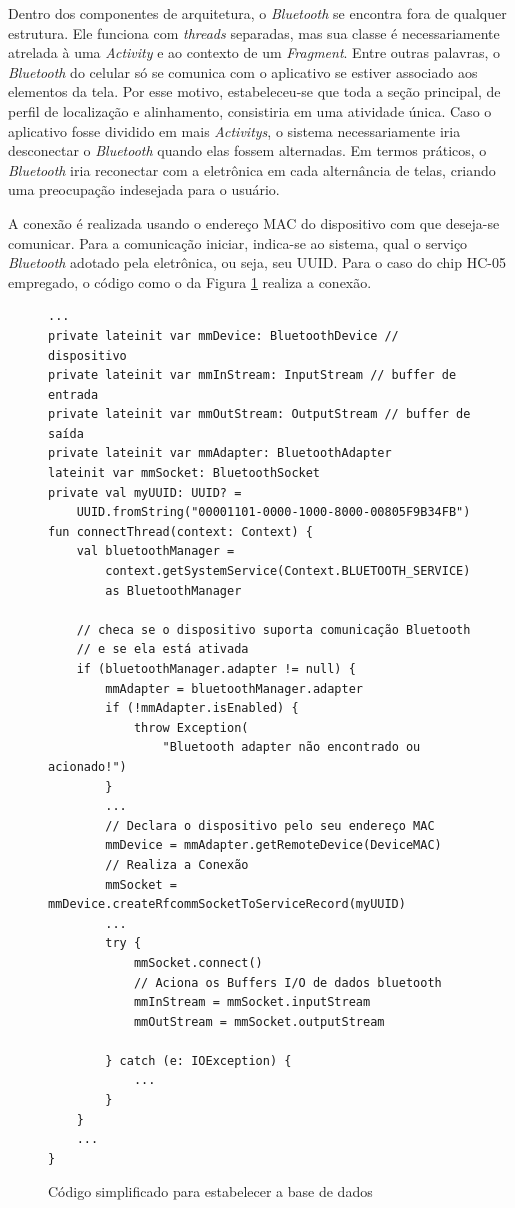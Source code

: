 Dentro dos componentes de arquitetura, o \textit{Bluetooth} se encontra fora de qualquer estrutura. Ele funciona com \textit{threads} separadas, mas sua classe é necessariamente atrelada à uma \textit{Activity} e ao contexto de um \textit{Fragment}. Entre outras palavras, o \textit{Bluetooth} do celular só se comunica com o aplicativo se estiver associado aos elementos da tela. Por esse motivo, estabeleceu-se que toda a seção principal, de perfil de localização e alinhamento, consistiria em uma atividade única. Caso o aplicativo fosse dividido em mais \textit{Activitys}, o sistema necessariamente iria desconectar o \textit{Bluetooth} quando elas fossem alternadas. Em termos práticos, o \textit{Bluetooth} iria reconectar com a eletrônica em cada alternância de telas, criando uma preocupação indesejada para o usuário. 

A conexão é realizada usando o endereço MAC do dispositivo com que deseja-se comunicar. Para a comunicação iniciar, indica-se ao sistema, qual o serviço \textit{Bluetooth} adotado pela eletrônica, ou seja, seu UUID. Para o caso do chip HC-05 empregado, o código como o da Figura \ref{code:bluetoothconnection} realiza a conexão.

\begin{figure}[!htb]
	\centering
	\caption{Código simplificado para estabelecer a base de dados}
	\vspace{-15pt}
	\begin{verbatim}
...
private lateinit var mmDevice: BluetoothDevice // dispositivo
private lateinit var mmInStream: InputStream // buffer de entrada
private lateinit var mmOutStream: OutputStream // buffer de saída
private lateinit var mmAdapter: BluetoothAdapter 
lateinit var mmSocket: BluetoothSocket
private val myUUID: UUID? =
	UUID.fromString("00001101-0000-1000-8000-00805F9B34FB")
fun connectThread(context: Context) {
	val bluetoothManager =
		context.getSystemService(Context.BLUETOOTH_SERVICE)
		as BluetoothManager
	
	// checa se o dispositivo suporta comunicação Bluetooth
	// e se ela está ativada
	if (bluetoothManager.adapter != null) {
		mmAdapter = bluetoothManager.adapter
		if (!mmAdapter.isEnabled) {
			throw Exception(
				"Bluetooth adapter não encontrado ou acionado!")
		}
		...
		// Declara o dispositivo pelo seu endereço MAC
		mmDevice = mmAdapter.getRemoteDevice(DeviceMAC)
		// Realiza a Conexão
		mmSocket = mmDevice.createRfcommSocketToServiceRecord(myUUID)
		...
		try {
			mmSocket.connect()
			// Aciona os Buffers I/O de dados bluetooth
			mmInStream = mmSocket.inputStream
			mmOutStream = mmSocket.outputStream
			
		} catch (e: IOException) {
			...
		}
	}
	...
}		
	\end{verbatim}
	\label{code:bluetoothconnection}
	\vspace{-30pt}
\end{figure}

